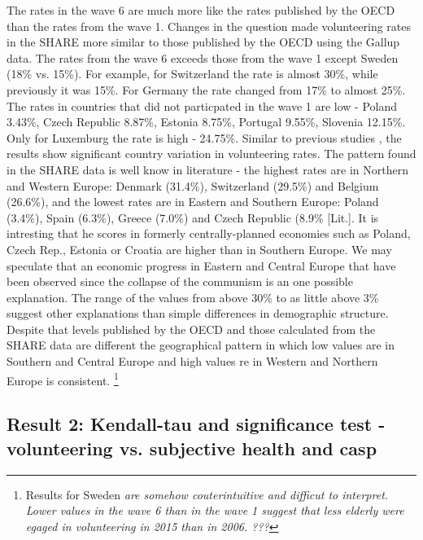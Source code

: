 \documentclass[10pt, letterpaper]{article}
\begin{document}
\begin{spacing}{1.4}
\begin{spacing}{.9}
	 
      \label{OECDSHARE} 
\end{spacing}

The rates in the wave 6 are much more like the rates published by the OECD than the rates from the wave 1. Changes in the question made volunteering rates in the SHARE more similar to those published by the OECD using the Gallup data. The rates from the wave 6 exceeds those from the wave 1 except Sweden (18\% vs. 15\%).  For example, for Switzerland the rate is almost 30\%, while previously it was 15\%. For Germany the rate changed from 17\% to almost 25\%. The rates in countries that did not particpated in the wave 1 are low - Poland 3.43\%, Czech Republic 8.87\%, Estonia 8.75\%, Portugal 9.55\%, Slovenia 12.15\%. Only for Luxemburg the rate is high - 24.75\%. Similar to previous studies , the results show significant country variation in volunteering rates. The pattern found in the SHARE data is well know in literature - the highest rates are in Northern and Western Europe:  Denmark (31.4\%), Switzerland (29.5\%) and Belgium (26.6\%), and the lowest rates are in Eastern and Southern Europe: Poland (3.4\%), Spain (6.3\%), Greece (7.0\%) and Czech Republic (8.9\% [Lit.]. It is intresting that he scores in formerly centrally-planned economies such as Poland, Czech Rep., Estonia or Croatia are higher than in Southern Europe. We may speculate that an economic progress in Eastern and Central Europe that have been observed since the collapse of the communism is an one possible explanation. The range of the values from above 30\% to as little above 3\% suggest other explanations than simple differences in demographic structure.   Despite that levels published by the OECD and those calculated from the SHARE data are different the geographical pattern in which low values are in Southern and Central Europe and high values re in  Western and Northern Europe is consistent. \footnote{Results for Sweden \textit{are somehow couterintuitive and difficut to interpret. Lower values in the wave 6 than in the wave 1 suggest that less elderly were egaged in volunteering in 2015 than in 2006. ??? }} \\



\subsection{Result 2: Kendall-tau and significance test - volunteering vs. subjective health and casp}


\end{spacing}
\end{document}
